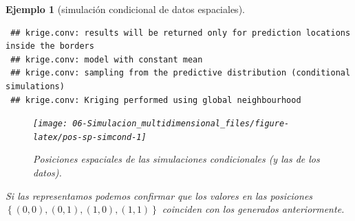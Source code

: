 \documentclass[
  10pt,
]{book}
\theoremstyle{break}
\newtheorem{example}{Ejemplo}[chapter]
\theoremstyle{nonumberplain}
\begin{document}
\begin{example}[simulación condicional de datos espaciales]
\begin{verbatim}
 ## krige.conv: results will be returned only for prediction locations inside the borders
 ## krige.conv: model with constant mean
 ## krige.conv: sampling from the predictive distribution (conditional simulations)
 ## krige.conv: Kriging performed using global neighbourhood
\end{verbatim}

\begin{figure}[!htbp]

{\centering \texttt{[image: 06-Simulacion\_multidimensional\_files/figure-latex/pos-sp-simcond-1]} 

}

\caption{Posiciones espaciales de las simulaciones condicionales (y las de los datos).}\label{fig:pos-sp-simcond}
\end{figure}

Si las representamos podemos confirmar que los valores en las posiciones \(\left\{(0,0),(0,1),(1,0),(1,1)\right\}\) coinciden con los generados anteriormente.


\end{example}
\end{document}
